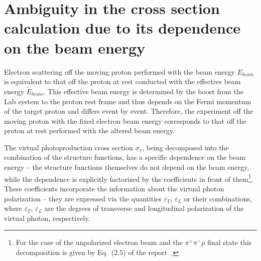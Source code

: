 \section{Ambiguity in the cross section calculation due to its dependence on the beam energy}
\label{sect:ambig}



Electron scattering off the moving proton performed with the beam energy $E_{beam}$ is equivalent to that off the proton at rest conducted with the effective beam energy $\widetilde{E}_{beam}$. This effective beam energy is determined by the boost from the Lab system to the proton rest frame and thus depends on the Fermi momentum of the target proton and differs event by event. Therefore, the experiment off the moving proton with the fixed electron beam energy corresponds to that off the proton at rest performed with the altered beam energy.




The virtual photoproduction cross section $\sigma_{v}$, being decomposed into the combination of the structure functions, has a specific dependence on the beam energy -- the structure functions themselves do not depend on the beam energy, while the dependence is explicitly factorized by the coefficients in front of them\footnote[6]{ For the case of the unpolarized electron beam and the $\pi^{+}\pi^{-}p$ final state this decomposition is given by Eq.~(2.5) of the report~\cite{twopeg}.}. These coefficients incorporate the information about the virtual photon polarization -- they are expressed via the quantities $\varepsilon_{T}$, $\varepsilon_{L}$ or their combinations, where $\varepsilon_{T}$, $\varepsilon_{L}$ are the degrees of transverse and longitudinal polarization of the virtual photon, respectively.




